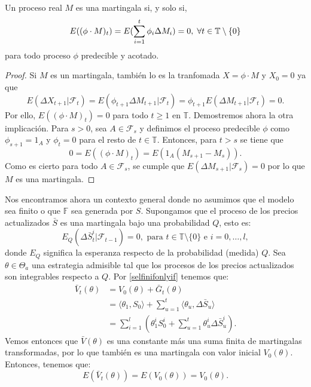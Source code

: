 \bigskip
\begin{teoremaBox}\label{2.3.5}
	Un proceso real $ M $ es una martingala si, y solo si, 
	\[
	E((\phi \cdot M)_t) = E(\sum_{i=1}^{t}\phi_i\Delta M_i) = 0, \hspace{1mm} \forall t \in \mathbb{T}\setminus\{0\}
	\]
	para todo proceso $ \phi $ predecible y acotado.
\end{teoremaBox}
\begin{proof}
	Si $ M $ es un martingala, también lo es la tranfomada $ X = \phi \cdot M $ y $ X_0 =0 $ ya que
	\[
	E(\Delta X_{t+1}|\mathcal{F}_t) = E(\phi_{t+1}\Delta M_{t+1}|\mathcal{F}_t) =  \phi_{t+1} E(\Delta M_{t+1}|\mathcal{F}_t) = 0.
	\] 
	Por ello, $ E((\phi \cdot M)_t) = 0 $ para todo $ t \geq 1 $ en $ \mathbb{T} $.
	Demostremos ahora la otra implicación. Para $ s > 0 $, sea $ A \in \mathcal{F}_s $ y definimos el proceso predecible $ \phi $ como $ \phi_{s+1} = 1_A $ y $ \phi_t = 0 $ para el resto de $ t\in \mathbb{T} $. Entonces, para $ t > s $ se tiene que
	\[
	0 = E((\phi \cdot M)_t) = E(1_A(M_{s+1}-M_s)).
	\]
	Como es cierto para todo $ A \in \mathcal{F}_s $, se cumple que $ E(\Delta M_{s+1} | \mathcal{F}_s) = 0 $ por lo que $ M $ es una martingala.
\end{proof}
\bigskip
Nos encontramos ahora un contexto general donde no asumimos que el modelo sea finito o que $ \mathbb{F} $ sea generada por $ S $. Supongamos que el proceso de los precios actualizados $ \bar{S} $ es una martingala bajo una probabilidad $ Q $, esto es:
\[
E_Q (\Delta \bar{S}^i_t | \mathcal{F}_{t-1}) = 0, \text{ para } t \in \mathbb{T}\setminus \{0\} \text{ e } i = 0,\dots,l,
\]
donde $ E_Q $ significa la esperanza respecto de la probabilidad (medida) $ Q $. Sea $ \theta \in \Theta_a $ una estrategia admisible tal que los procesos de los precios actualizados son integrables respecto a $ Q $. Por \eqref{selfinifonlyif} tenemos que:
\begin{equation*}
\begin{split}
\bar{V}_t(\theta) &= V_0(\theta) + \bar{G}_t(\theta) \\
&= \langle \theta_{1}, S_0 \rangle + \sum_{u=1}^{t} \langle \theta_{u}, \Delta \bar{S}_u \rangle \\
&= \sum_{i=1}^{l}(\theta_1^i S_0^i + \sum_{u=1}^{t} \theta_{u}^i \Delta \bar{S}_u^i).
\end{split}
\end{equation*}
Vemos entonces que $ \bar{V}(\theta) $ es una constante más una suma finita de martingalas transformadas, por lo que también es una martingala con valor inicial $ V_0 (\theta) $. Entonces, tenemos que: \[ E(\bar{V}_t (\theta)) = E(V_0 (\theta)) = V_0(\theta) .\] 

